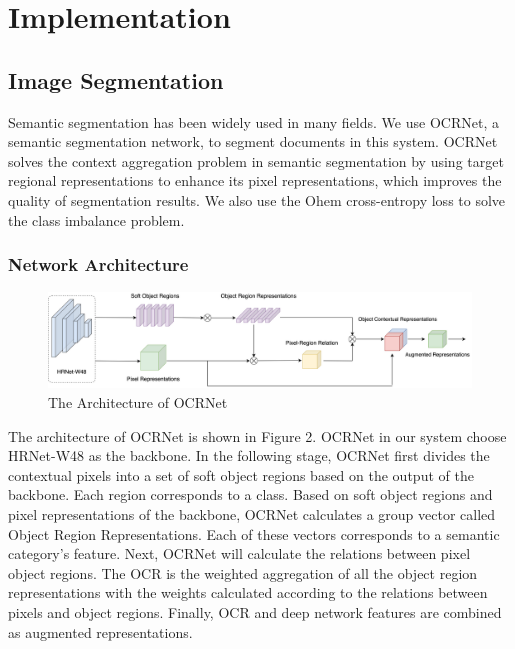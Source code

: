 \documentclass[10pt, conference, compsocconf]{IEEEtran}
\begin{document}
\section{Implementation}

\subsection{Image Segmentation}

Semantic segmentation has been widely used in many fields. 
We use OCRNet\cite{yuan2020object}, a semantic segmentation network, to segment documents in this system. 
OCRNet solves the context aggregation problem in semantic segmentation by using target regional representations to enhance its pixel representations, which improves the quality of segmentation results. 
We also use the Ohem cross-entropy\cite{shrivastava2016training} loss to solve the class imbalance problem. 

\subsubsection{Network Architecture}

\begin{figure}[!h]
	\centering
	\includegraphics[width=7in]{./Assets/131245.jpg}
	\caption{The Architecture of OCRNet}
\end{figure}

The architecture of OCRNet is shown in Figure 2. OCRNet in our system choose HRNet-W48\cite{wang2020deep} as the backbone. In the following stage, OCRNet first divides the contextual pixels into a set of soft object regions based on the output of the backbone. Each region corresponds to a class. Based on soft object regions and pixel representations of the backbone, OCRNet calculates a group vector called Object Region Representations. Each of these vectors corresponds to a semantic category's feature. Next, OCRNet will calculate the relations between pixel object regions. The OCR is the weighted aggregation of all the object region representations with the weights calculated according to the relations between pixels and object regions\cite{yuan2020object}. Finally, OCR and deep network features are combined as augmented representations.
\end{document}
